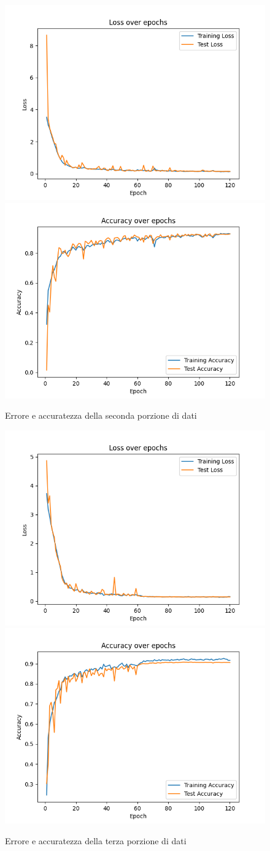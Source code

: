 \begin{figure}
	\centering
	\includegraphics[width=0.4\columnwidth]{Immagini/fold_1_loss.png} \includegraphics[width=0.4\columnwidth]{Immagini/fold_1_accuracy.png}
	\caption{Errore e accuratezza della seconda porzione di dati}
	\label{fig:loss e accuratezza della seconda porzione di dati}
\end{figure}

\begin{figure}
	\centering
	\includegraphics[width=0.4\columnwidth]{Immagini/fold_2_loss.png} \includegraphics[width=0.4\columnwidth]{Immagini/fold_2_accuracy.png}
	\caption{Errore e accuratezza della terza porzione di dati}
	\label{fig:loss e accuratezza della terza porzione di dati}
\end{figure}

